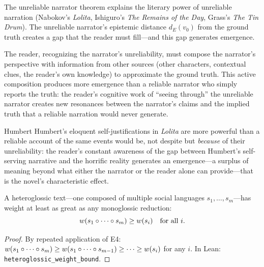 \begin{interpretation}
\label{interp:unreliable}
The unreliable narrator theorem explains the literary power of unreliable
narration (Nabokov's \textit{Lolita}, Ishiguro's \textit{The Remains of the
Day}, Grass's \textit{The Tin Drum}).  The unreliable narrator's epistemic
distance $d_E(v_0)$ from the ground truth creates a gap that the reader must
fill---and this gap generates emergence.

The reader, recognizing the narrator's unreliability, must compose the
narrator's perspective with information from other sources (other characters,
contextual clues, the reader's own knowledge) to approximate the ground truth.
This active composition produces more emergence than a reliable narrator who
simply reports the truth: the reader's cognitive work of ``seeing through''
the unreliable narrator creates new resonances between the narrator's claims
and the implied truth that a reliable narration would never generate.

Humbert Humbert's eloquent self-justifications in \textit{Lolita} are more
powerful than a reliable account of the same events would be, not despite
but \emph{because} of their unreliability: the reader's constant awareness
of the gap between Humbert's self-serving narrative and the horrific reality
generates an emergence---a surplus of meaning beyond what either the narrator
or the reader alone can provide---that is the novel's characteristic effect.
\end{interpretation}


\begin{theorem}
\label{thm:heteroglossic-weight}
A heteroglossic text---one composed of multiple social languages $s_1, \ldots, s_m$---has weight at least as great as any monoglossic reduction:
\[
  w(s_1 \circ \cdots \circ s_m) \geq w(s_i) \quad \text{for all } i.
\]
\end{theorem}

\begin{proof}
By repeated application of E4: $w(s_1 \circ \cdots \circ s_m) \geq w(s_1 \circ \cdots \circ s_{m-1}) \geq \cdots \geq w(s_i)$ for any $i$.  In Lean: \texttt{heteroglossic\_weight\_bound}.
\end{proof}

